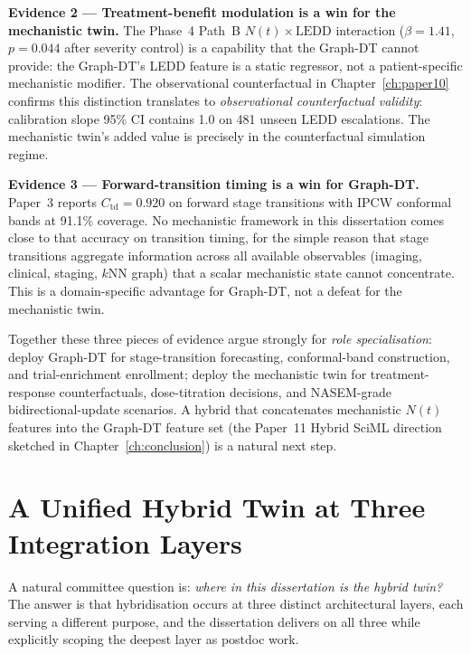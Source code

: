 \textbf{Evidence 2 --- Treatment-benefit modulation is a win for the mechanistic twin.} The Phase~4 Path~B $N(t) \times \mathrm{LEDD}$ interaction ($\beta = 1.41$, $p = 0.044$ after severity control) is a capability that the Graph-DT cannot provide: the Graph-DT's LEDD feature is a static regressor, not a patient-specific mechanistic modifier. The observational counterfactual in Chapter~\ref{ch:paper10} confirms this distinction translates to \emph{observational counterfactual validity}: calibration slope 95\% CI contains 1.0 on 481 unseen LEDD escalations. The mechanistic twin's added value is precisely in the counterfactual simulation regime.

\textbf{Evidence 3 --- Forward-transition timing is a win for Graph-DT.} Paper~3 reports $C_\text{td} = 0.920$ on forward stage transitions with IPCW conformal bands at 91.1\% coverage. No mechanistic framework in this dissertation comes close to that accuracy on transition timing, for the simple reason that stage transitions aggregate information across all available observables (imaging, clinical, staging, $k$NN graph) that a scalar mechanistic state cannot concentrate. This is a domain-specific advantage for Graph-DT, not a defeat for the mechanistic twin.

Together these three pieces of evidence argue strongly for \emph{role specialisation}: deploy Graph-DT for stage-transition forecasting, conformal-band construction, and trial-enrichment enrollment; deploy the mechanistic twin for treatment-response counterfactuals, dose-titration decisions, and NASEM-grade bidirectional-update scenarios. A hybrid that concatenates mechanistic $N(t)$ features into the Graph-DT feature set (the Paper~11 Hybrid SciML direction sketched in Chapter~\ref{ch:conclusion}) is a natural next step.

\section{A Unified Hybrid Twin at Three Integration Layers}
\label{sec:disc-hybrid-architecture}

A natural committee question is: \emph{where in this dissertation is the hybrid twin?} The answer is that hybridisation occurs at three distinct architectural layers, each serving a different purpose, and the dissertation delivers on all three while explicitly scoping the deepest layer as postdoc work.


